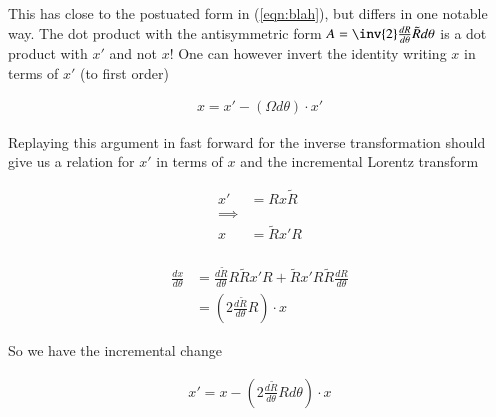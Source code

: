 \documentclass{article}
\begin{document}
This has close to the postuated form in (\ref{eqn:blah}), but differs in one notable way.  The dot product with the antisymmetric form $A = \inv{2} \frac{dR}{d\theta} \tilde{R} d\theta$ is a dot product with $x'$ and not $x$!  One can however 
invert the identity writing $x$ in terms of $x'$ (to first order)

\begin{align*}
x = x' - ( \Omega d\theta ) \cdot x'
\end{align*}

Replaying this argument in fast forward for the inverse transformation should give us a relation for $x'$ in terms of $x$
and the incremental Lorentz transform

\begin{align*}
x' &= R x \tilde{R} \\
\implies \\
x &= \tilde{R} x' {R} \\
\end{align*}

\begin{align*}
\frac{dx}{d\theta}
&= \frac{d \tilde{R}}{d\theta} R \tilde{R} x' R + \tilde{R} x' R \tilde{R} \frac{d {R}}{d\theta}  \\
&= (2 \frac{d \tilde{R}}{d\theta} R ) \cdot x
\end{align*}

So we have the incremental change

\begin{align*}
x'= x - \left(2 \frac{d \tilde{R}}{d\theta} R d\theta \right) \cdot x
\end{align*}



\end{document}
